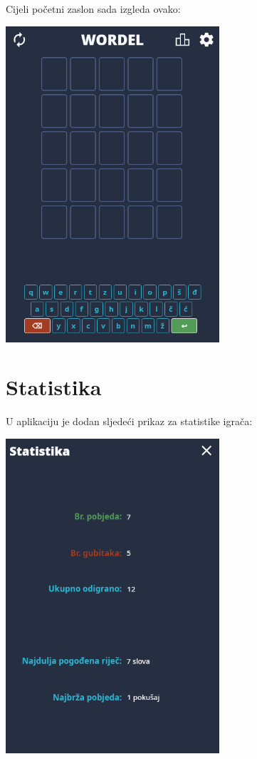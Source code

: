 \documentclass[12pt,a4paper]{report}
\begin{document}
\newpage
Cijeli početni zaslon sada izgleda ovako:

\smallskip
\begin{center}
    \includegraphics[width=300px,keepaspectratio]{./figures/glavni_zaslon.png}
\end{center}

\newpage
\section{Statistika}

U aplikaciju je dodan sljedeći prikaz za statistike igrača:

\begin{center}
    \includegraphics[width=300px,keepaspectratio]{./figures/statistika.png}
\end{center}
\end{document}
